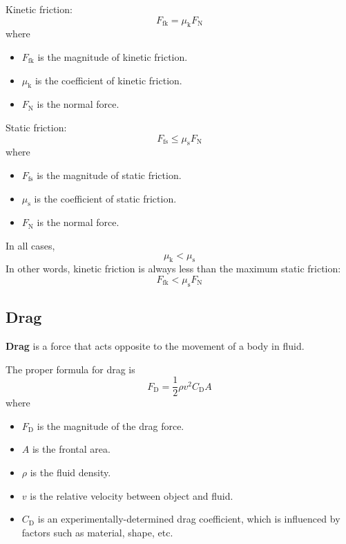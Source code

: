 \documentclass[a4paper, titlepage]{book}
\begin{document}
Kinetic friction:
\begin{equation}
    F_\mathrm{fk} = \mu_\mathrm{k} F_\mathrm{N}
\end{equation}
where
\begin{itemize}
    \item \(F_\mathrm{fk}\) is the magnitude of kinetic friction.
    \item \(\mu_\mathrm{k}\) is the coefficient of kinetic friction.
    \item \(F_\mathrm{N}\) is the normal force.
\end{itemize}

Static friction:
\begin{equation}
    F_\mathrm{fs} \le \mu_\mathrm{s} F_\mathrm{N}
\end{equation}
where
\begin{itemize}
    \item \(F_\mathrm{fs}\) is the magnitude of static friction.
    \item \(\mu_\mathrm{s}\) is the coefficient of static friction.
    \item \(F_\mathrm{N}\) is the normal force.
\end{itemize}

In all cases,
\begin{equation}
    \mu_\mathrm{k} < \mu_\mathrm{s}
\end{equation}
In other words, kinetic friction is always less than the maximum static friction:
\begin{equation}
    F_\mathrm{fk} < \mu_\mathrm{s} F_\mathrm{N}
\end{equation}

\subsection{Drag}

\textbf{Drag} is a force that acts opposite to the movement of a body in fluid.

The proper formula for drag is
\begin{equation}
    F_\mathrm{D} = \frac{1}{2} \rho v^2 C_\mathrm{D} A
\end{equation}
where
\begin{itemize}
    \item \(F_\mathrm{D}\) is the magnitude of the drag force.
    \item \(A\) is the frontal area.
    \item \(\rho\) is the fluid density.
    \item \(v\) is the relative velocity between object and fluid.
    \item
        \(C_\mathrm{D}\) is an experimentally-determined drag coefficient,
        which is influenced by factors such as material, shape, etc.
\end{itemize}
\end{document}
